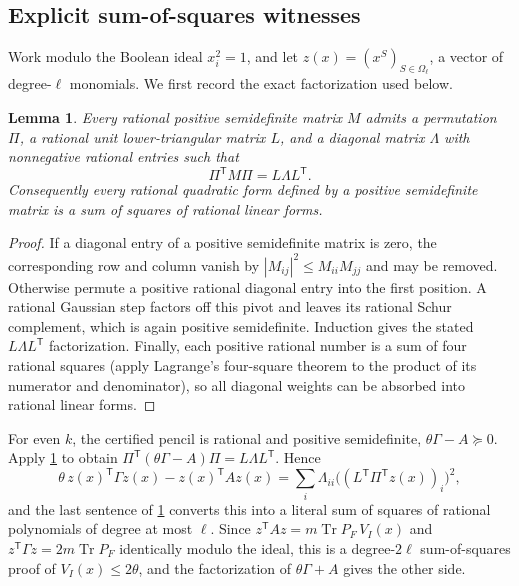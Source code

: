 \documentclass[11pt]{article}
\newtheorem{lemma}[lemma]{Lemma}
\theoremstyle{definition}
\theoremstyle{remark}
\newcommand{\1}{\mathbf 1}
\DeclareMathOperator{\Tr}{Tr}
\numberwithin{equation}{section}
\begin{document}
\subsection{Explicit sum-of-squares witnesses}

Work modulo the Boolean ideal $x_i^2=1$, and let
$z(x)=(x^S)_{S\in\Omega_\ell}$, a vector of degree-$\ell$ monomials.
We first record the exact factorization used below.

\begin{lemma}
\label{lem:rational-psd}
Every rational positive semidefinite matrix $M$ admits a permutation
$\Pi$, a rational unit lower-triangular matrix $L$, and a diagonal matrix
$\Lambda$ with nonnegative rational entries such that
\[
 \Pi^{\mathsf T}M\Pi=L\Lambda L^{\mathsf T}.
\]
Consequently every rational quadratic form defined by a positive
semidefinite matrix is a sum of squares of rational linear forms.
\end{lemma}
\begin{proof}
If a diagonal entry of a positive semidefinite matrix is zero, the
corresponding row and column vanish by
$|M_{ij}|^2\le M_{ii}M_{jj}$ and may be removed.  Otherwise permute a
positive rational diagonal entry into the first position.  A rational
Gaussian step factors off this pivot and leaves its rational Schur
complement, which is again positive semidefinite.  Induction gives the
stated $L\Lambda L^{\mathsf T}$ factorization.  Finally, each positive
rational number is a sum of four rational squares (apply Lagrange's
four-square theorem to the product of its numerator and denominator), so
all diagonal weights can be absorbed into rational linear forms.
\end{proof}

For even $k$, the certified pencil is rational and positive semidefinite,
$\theta\Gamma-A\succeq0$.  Apply \cref{lem:rational-psd} to obtain
$\Pi^{\mathsf T}(\theta\Gamma-A)\Pi=L\Lambda L^{\mathsf T}$.  Hence
\begin{equation}\label{eq:sos-pencil}
 \theta\,z(x)^{\mathsf T}\Gamma z(x)-z(x)^{\mathsf T}Az(x)
 =\sum_i\Lambda_{ii}
 \bigl((L^{\mathsf T}\Pi^{\mathsf T}z(x))_i\bigr)^2,
\end{equation}
and the last sentence of \cref{lem:rational-psd} converts this into a
literal sum of squares of rational polynomials of degree at most $\ell$.
Since $z^{\mathsf T}Az=m\Tr P_F\,V_I(x)$ and
$z^{\mathsf T}\Gamma z=2m\Tr P_F$ identically modulo the ideal, this is
a degree-$2\ell$ sum-of-squares proof of $V_I(x)\le2\theta$, and the
factorization of $\theta\Gamma+A$ gives the other side.
\end{document}
